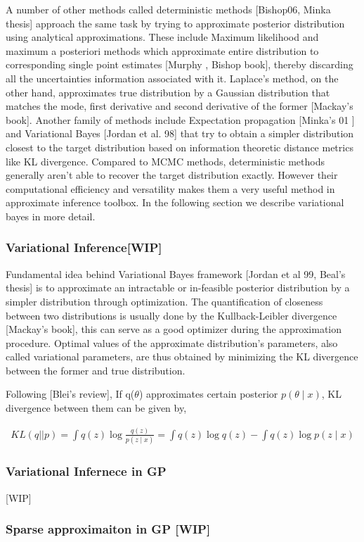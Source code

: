 A number of other methods called deterministic methods [Bishop06, Minka thesis] approach the same task by trying to approximate posterior distribution using analytical approximations. These include Maximum likelihood and maximum a posteriori methods which approximate entire distribution to corresponding single point estimates [Murphy , Bishop book], thereby discarding all the uncertainties information associated with it. Laplace’s method, on the other hand, approximates true distribution by a Gaussian distribution that matches the mode, first derivative and second derivative of the former [Mackay’s book]. Another family of methods include Expectation propagation [Minka’s 01 ] and Variational Bayes [Jordan et al. 98] that try to obtain a simpler distribution closest to the target distribution based on information theoretic distance metrics like KL divergence.  
Compared to MCMC methods, deterministic methods generally aren’t able to recover the target distribution exactly. However their computational efficiency and versatility makes them a very useful method in approximate inference toolbox. In the following section we describe variational bayes in more detail.

\subsubsection{Variational Inference[WIP]}

Fundamental idea behind Variational Bayes framework [Jordan et al 99, Beal’s thesis] is to approximate an intractable or in-feasible posterior distribution by a simpler distribution through optimization. The quantification of closeness between two distributions is usually done by the Kullback-Leibler divergence [Mackay’s book], this can serve as a good optimizer during the approximation procedure. Optimal values of the approximate distribution’s parameters, also called variational parameters, are thus obtained by minimizing the KL divergence between the former and true distribution. 

Following [Blei’s review],
If q($\theta$) approximates certain posterior $p(\theta \mid x)$, KL divergence between them can be given by,

\begin{eqnarray*}
    KL(q||p) = \int q(z) \log \frac{q(z)}{p(z \mid x)}
        = \int q(z) \log q(z) - \int q(z) \log p(z \mid x)
\end{eqnarray*}



\subsubsection{Variational Infernece in GP }[WIP]

\subsubsection{Sparse approximaiton in GP [WIP]}